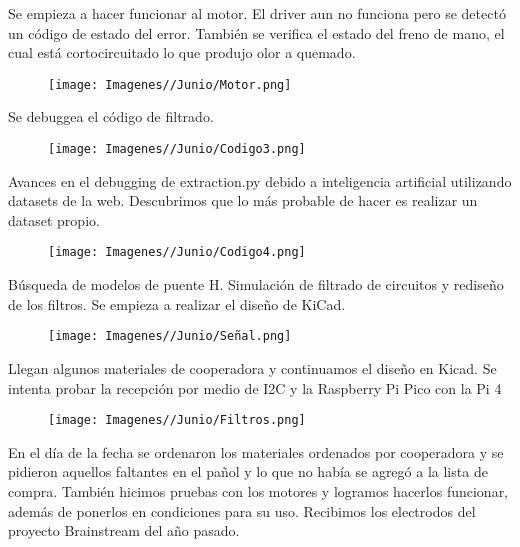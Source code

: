 \documentclass{article}
\begin{document}
\newpage

Se empieza a hacer funcionar al motor. El driver aun no funciona pero se detectó un código de estado del error. También se verifica el estado del freno de mano, el cual está cortocircuitado lo que produjo olor a quemado.

\begin{figure}[H]
    \centering
    \texttt{[image: Imagenes//Junio/Motor.png]}
\end{figure}

Se debuggea el código de filtrado.

\begin{figure}[H]
    \centering
    \texttt{[image: Imagenes//Junio/Codigo3.png]}
\end{figure}

\newpage

Avances en el debugging de extraction.py debido a inteligencia artificial utilizando datasets de la web. Descubrimos que lo más probable de hacer es realizar un dataset propio.

\begin{figure}[H]
    \centering
    \texttt{[image: Imagenes//Junio/Codigo4.png]}
\end{figure}


Búsqueda de modelos de puente H. Simulación de filtrado de circuitos y rediseño de los filtros. Se empieza a realizar el diseño de KiCad. 

\begin{figure}[H]
    \centering
    \texttt{[image: Imagenes//Junio/Señal.png]}
\end{figure}

\newpage

Llegan algunos materiales de cooperadora y continuamos el diseño en Kicad. Se intenta probar la recepción por medio de I2C y la Raspberry Pi Pico con la Pi 4

\begin{figure}[H]
    \centering
    \texttt{[image: Imagenes//Junio/Filtros.png]}
\end{figure}


En el día de la fecha se ordenaron los materiales ordenados por cooperadora y se pidieron aquellos faltantes en el pañol y lo que no había se agregó a la lista de compra. También hicimos pruebas con los motores y logramos hacerlos funcionar, además de ponerlos en condiciones para su uso. Recibimos los electrodos del proyecto Brainstream del año pasado.
\end{document}
